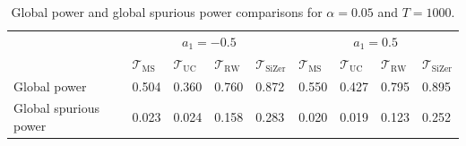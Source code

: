 \begin{table}[t!]
\footnotesize{
\caption{Global power and global spurious power comparisons for $\alpha=0.05$ and $T=1000$.}\label{tab:sim:power:bump}
\begin{tabularx}{\textwidth}{l@{\hskip 20pt} Z@{\hskip 6pt}Z@{\hskip 6pt}Z@{\hskip 6pt}Z@{\hskip 20pt}Z@{\hskip 6pt}Z@{\hskip 6pt}Z@{\hskip 6pt}Z}
\toprule
 &  &  \\
 & $\mathcal{T}_{\text{MS}}$ & $\mathcal{T}_{\text{UC}}$ & $\mathcal{T}_{\text{RW}}$ & $\mathcal{T}_{\text{SiZer}}$ & $\mathcal{T}_{\text{MS}}$ & $\mathcal{T}_{\text{UC}}$ & $\mathcal{T}_{\text{RW}}$ & $\mathcal{T}_{\text{SiZer}}$ \\
Global power           & 0.504 & 0.360 & 0.760 & 0.872  & 0.550 & 0.427 & 0.795 & 0.895 \\ 
Global spurious power  & 0.023 & 0.024 & 0.158 & 0.283  & 0.020 & 0.019 & 0.123 & 0.252 \\
\bottomrule
\end{tabularx}}
\vspace{0.2cm}
\end{table}


